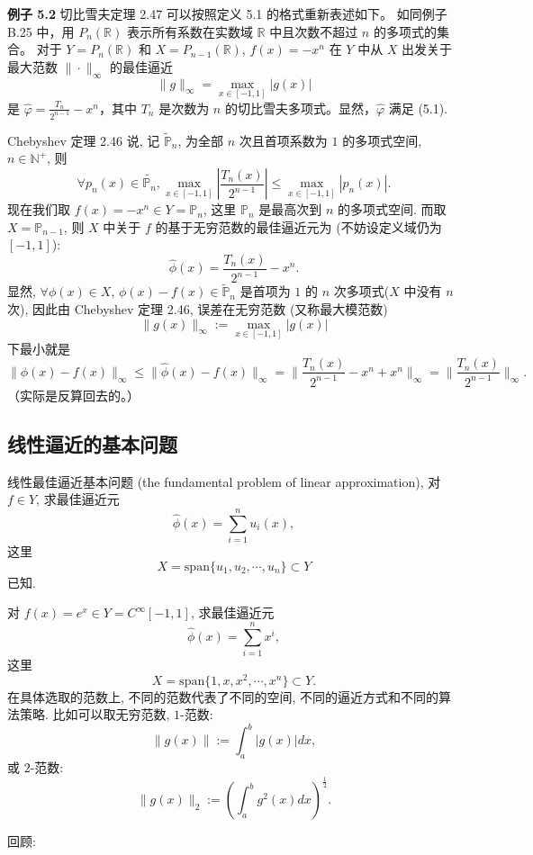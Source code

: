\documentclass[a4paper]{ctexart}
\newcommand{\hl}[1]
{\noindent {\bf {#1}}}
\begin{document}
{\noindent \textbf{例子 5.2} 切比雪夫定理 2.47 可以按照定义 5.1 的格式重新表述如下。
如同例子 B.25 中，用 \( P_{n}(\mathbb{R}) \) 表示所有系数在实数域 \( \mathbb{R} \) 中且次数不超过 \( n \) 的多项式的集合。
对于 \( Y = P_{n}(\mathbb{R}) \) 和 \( X = P_{n-1}(\mathbb{R}) \), \( f(x) = -x^n \) 在 \( Y \) 中从 \( X \) 
出发关于最大范数 \( \|\cdot\|_{\infty} \) 的最佳逼近
\[
  \|g\|_{\infty} = \max_{x \in [-1,1]} |g(x)| \tag{5.2}
\]
是 \( \hat{\varphi} = \frac{T_{n}}{2^{n-1}} - x^n \)，其中 \( T_{n} \) 是次数为 \( n \) 的切比雪夫多项式。显然，\( \hat{\varphi} \) 满足 (5.1).

\hl{例 5.2}  Chebyshev 定理 2.46 说, 记 $\tilde{{\mathbb{P}}}_n$, 为全部 $n$ 次且首项系数为 $1$ 
的多项式空间, $n \in \mathbb{N}^+$, 则
$$
\forall p_n(x) \in \tilde{\mathbb{P}_n}, 
\max_{x \in [-1, 1]}\left|\frac{T_n(x)}{2^{n - 1}}\right|
\leq \max_{x \in [-1, 1]} |p_n(x)|.
$$
现在我们取 $f(x) = -x^n \in Y = \mathbb{P}_n$, 
这里 $\mathbb{P}_n$ 是最高次到 $n$ 的多项式空间.
而取 $X = \mathbb{P}_{n - 1}$, 则 $X$ 中关于 $f$ 的基于无穷范数的最佳逼近元为 
(不妨设定义域仍为 $[-1, 1]$):
$$
\hat{\phi}(x) = \frac{T_n(x)}{2^{n - 1}} - x^n.
$$
显然, $\forall \phi(x) \in X$, $\phi(x) - f(x) \in \tilde{\mathbb{P}}_{n}$ 
是首项为 $1$ 的
$n$ 次多项式($X$ 中没有 $n$ 次), 因此由 Chebyshev 定理 2.46, 
误差在无穷范数 (又称最大模范数)
$$
\|g(x)\|_\infty := \max_{x \in [-1, 1]}|g(x)|
$$
下最小就是
$$
\|\phi(x) - f(x)\|_\infty \leq \|\hat{\phi}(x) - f(x)\|_\infty 
= \|\frac{T_n(x)}{2^{n - 1}} - x^n + x^n\|_\infty = \|\frac{T_n(x)}{2^{n - 1}}\|_\infty.
$$
（实际是反算回去的。）

\subsection{线性逼近的基本问题}

\hl{定义 5.3} 线性最佳逼近基本问题 (the fundamental problem of linear approximation), 
对 $f \in Y$, 求最佳逼近元
$$
\hat{\phi}(x) = \sum_{i = 1}^n u_i(x), 
$$
这里
$$
X = \mbox{span}\{u_1, u_2, \cdots, u_n\} \subset Y
$$
已知.

\hl{例 5.4} 对 $f(x) = e^x \in Y = C^\infty[-1, 1]$, 
求最佳逼近元
$$
\hat{\phi}(x) = \sum_{i = 1}^n x^i, 
$$
这里
$$
X = \mbox{span}\{1, x, x^2, \cdots, x^n\} \subset Y.
$$
在具体选取的范数上, 不同的范数代表了不同的空间, 不同的逼近方式和不同的算法策略.
比如可以取无穷范数, $1$-范数:
$$
\|g(x)\| := \int_a^b |g(x)| dx,
$$
或 $2$-范数:
$$
\|g(x)\|_2 := \left(\int_a^b g^2(x) dx\right)^\frac{1}{2}.
$$

回顾:

}
\end{document}
